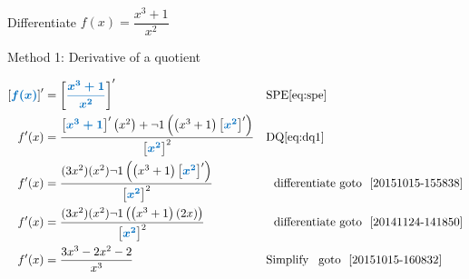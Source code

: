 \documentclass[20150903-160354-rs2.2-MarksMathNotebook.tex]{subfiles}
\begin{document}
\begin{example}[id:20151015-153507] \label{20151015-153507} \hfill \\
Differentiate $f(x)=\dfrac{x^3+1}{x^2}$

\soln

\solnsteps

Method 1: Derivative of a quotient

\begin{align*}
\farg{f(x)}' &= \farg{\dfrac{x^3+1}{x^2}}' && \text{SPE} \eqref{eq:spe} \\
f'(x) &= \dfrac{\farg{x^3+1}^\prime \left(x^2\right) + \neg 1 \left( \left(x^3+1 \right) \farg{x^2}' \right)}{\farg{x^2}^2} && \text{DQ} \eqref{eq:dq1} \\
f'(x) &= \dfrac{(3x^2)(x^2) \neg 1 \left( \left(x^3+1 \right) \farg{x^2}' \right)}{\farg{x^2}^2} &&  \, \text{\, differentiate goto \,} \, \ref{20151015-155838} \\
f'(x) &= \dfrac{(3x^2)(x^2) \neg 1 \left( \left(x^3+1 \right) (2x) \right)}{\farg{x^2}^2} &&  \, \text{\, differentiate goto \,} \, \ref{20141124-141850} \\
f'(x) &= \dfrac{3x^3-2x^2-2}{x^3} && \text{Simplify \, goto \,} \, \ref{20151015-160832}
\end{align*}
\end{example}
\end{document}
